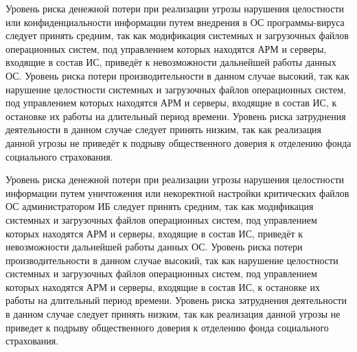 \point Уровень риска денежной потери при реализации угрозы нарушения
целостности или конфиденциальности информации путем внедрения в ОС
программы-вируса следует принять средним, так как модификация
системных и загрузочных файлов операционных систем, под управлением
которых находятся АРМ и серверы, входящие в состав ИС, приведёт к
невозможности дальнейшей работы данных ОС. Уровень риска потери
производительности в данном случае высокий, так как нарушение
целостности системных и загрузочных файлов операционных систем, под
управлением которых находятся АРМ и серверы, входящие в состав ИС, к
остановке их работы на длительный период времени. Уровень риска
затруднения деятельности в данном случае следует принять низким, так
как реализация данной угрозы не приведёт к подрыву общественного
доверия к отделению фонда социального страхования.

\point Уровень риска денежной потери при реализации угрозы нарушения
целостности информации путем уничтожения или некоректной настройки
критических файлов ОС администратором ИБ следует принять средним, так
как модификация системных и загрузочных файлов операционных систем,
под управлением которых находятся АРМ и серверы, входящие в состав ИС,
приведёт к невозможности дальнейшей работы данных ОС. Уровень риска
потери производительности в данном случае высокий, так как нарушение
целостности системных и загрузочных файлов операционных систем, под
управлением которых находятся АРМ и серверы, входящие в состав ИС, к
остановке их работы на длительный период времени. Уровень риска
затруднения деятельности в данном случае следует принять низким, так
как реализация данной угрозы не приведет к подрыву общественного
доверия к отделению фонда социального страхования.


